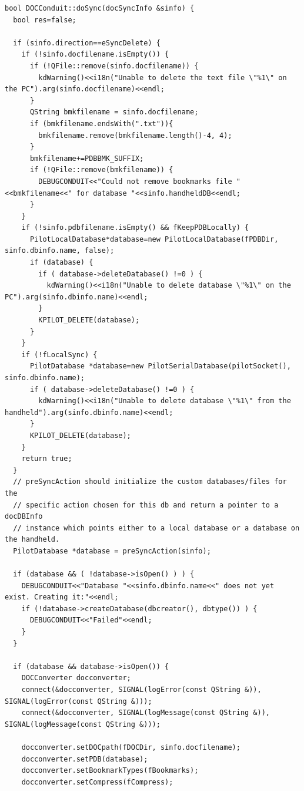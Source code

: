 \documentclass[10pt,a4paper]{article}
\begin{document}
{\footnotesize
\begin{verbatim}
bool DOCConduit::doSync(docSyncInfo &sinfo) {
  bool res=false;
  
  if (sinfo.direction==eSyncDelete) {
    if (!sinfo.docfilename.isEmpty()) {
      if (!QFile::remove(sinfo.docfilename)) {
        kdWarning()<<i18n("Unable to delete the text file \"%1\" on the PC").arg(sinfo.docfilename)<<endl;
      }
      QString bmkfilename = sinfo.docfilename;
      if (bmkfilename.endsWith(".txt")){
        bmkfilename.remove(bmkfilename.length()-4, 4);
      }
      bmkfilename+=PDBBMK_SUFFIX;
      if (!QFile::remove(bmkfilename)) {
        DEBUGCONDUIT<<"Could not remove bookmarks file "<<bmkfilename<<" for database "<<sinfo.handheldDB<<endl;
      }
    }
    if (!sinfo.pdbfilename.isEmpty() && fKeepPDBLocally) {
      PilotLocalDatabase*database=new PilotLocalDatabase(fPDBDir, sinfo.dbinfo.name, false);
      if (database) {
        if ( database->deleteDatabase() !=0 ) {
          kdWarning()<<i18n("Unable to delete database \"%1\" on the PC").arg(sinfo.dbinfo.name)<<endl;
        }
        KPILOT_DELETE(database);
      }
    }
    if (!fLocalSync) {
      PilotDatabase *database=new PilotSerialDatabase(pilotSocket(), sinfo.dbinfo.name);
      if ( database->deleteDatabase() !=0 ) {
        kdWarning()<<i18n("Unable to delete database \"%1\" from the handheld").arg(sinfo.dbinfo.name)<<endl;
      }
      KPILOT_DELETE(database);
    }
    return true;
  }
  // preSyncAction should initialize the custom databases/files for the
  // specific action chosen for this db and return a pointer to a docDBInfo
  // instance which points either to a local database or a database on the handheld.
  PilotDatabase *database = preSyncAction(sinfo);

  if (database && ( !database->isOpen() ) ) {
    DEBUGCONDUIT<<"Database "<<sinfo.dbinfo.name<<" does not yet exist. Creating it:"<<endl;
    if (!database->createDatabase(dbcreator(), dbtype()) ) {
      DEBUGCONDUIT<<"Failed"<<endl;
    }
  }

  if (database && database->isOpen()) {
    DOCConverter docconverter;
    connect(&docconverter, SIGNAL(logError(const QString &)), SIGNAL(logError(const QString &)));
    connect(&docconverter, SIGNAL(logMessage(const QString &)), SIGNAL(logMessage(const QString &)));

    docconverter.setDOCpath(fDOCDir, sinfo.docfilename);
    docconverter.setPDB(database);
    docconverter.setBookmarkTypes(fBookmarks);
    docconverter.setCompress(fCompress);


\end{verbatim}}
\end{document}
